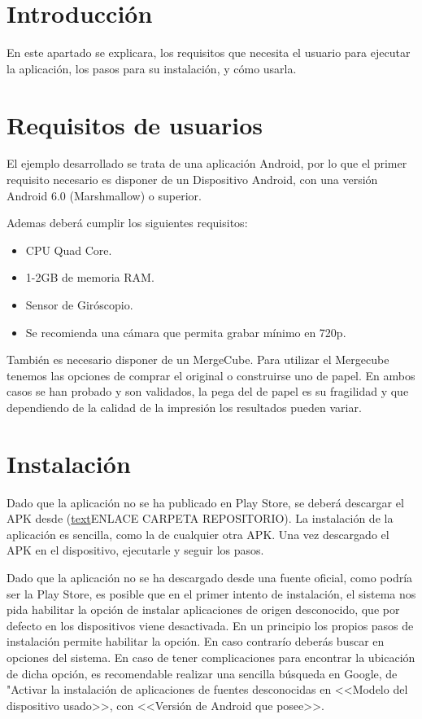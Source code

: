 
\section{Introducción}
 En este apartado se explicara, los requisitos que necesita el usuario para ejecutar la aplicación, los pasos para su instalación, y cómo usarla.
  
\section{Requisitos de usuarios}
 El ejemplo desarrollado se trata de una aplicación Android, por lo que el primer requisito necesario es disponer de un Dispositivo Android, con una versión Android 6.0 (Marshmallow) o superior.
  
 Ademas deberá cumplir los siguientes requisitos\cite{vuforia_devices}:
 \begin{itemize}
 	\item CPU Quad Core.
 	\item 1-2GB de memoria RAM.
 	\item Sensor de Giróscopio.
 	\item Se recomienda una cámara que permita grabar mínimo en 720p.  
 \end{itemize}
También es necesario disponer de un MergeCube. Para utilizar el Mergecube tenemos las opciones de comprar el original o construirse uno de papel. En ambos casos se han probado y son validados, la pega del de papel es su fragilidad y que dependiendo de la calidad de la impresión los resultados pueden variar.

\section{Instalación}

Dado que la aplicación no se ha publicado en Play Store, se deberá descargar el APK desde (\href{URL}{text}ENLACE CARPETA REPOSITORIO).
La instalación de la aplicación es sencilla, como la de cualquier otra APK. Una vez descargado el APK en el dispositivo, ejecutarle y seguir los pasos. 

Dado que la aplicación no se ha descargado desde una fuente oficial, como podría ser la Play Store, es posible que en el primer intento de instalación, el sistema nos pida habilitar la opción de instalar aplicaciones de origen desconocido, que por defecto en los dispositivos viene desactivada.
En un principio los propios pasos de instalación permite habilitar la opción. En caso contrarío deberás buscar en opciones del sistema. En caso de tener complicaciones para encontrar la ubicación de dicha opción, es recomendable realizar una sencilla búsqueda en Google, de "Activar la instalación de aplicaciones de fuentes desconocidas en <<Modelo del dispositivo usado>>, con <<Versión de Android que posee>>.


